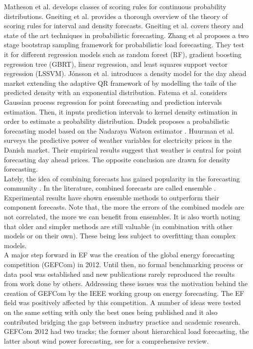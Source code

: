 Matheson et al. \cite{matheson1976scoring} develops classes of scoring rules for continuous probability distributions.
Gneiting et al. \cite{gneiting2007strictly}
provides a thorough overview of the theory of scoring rules for interval and density forecasts.
Gneiting et al. \cite{gneiting2014probabilistic}
covers theory and state of the art techniques in probabilistic forecasting.
Zhang et al \cite{zhang2020two} proposes a two stage bootstrap sampling framework for probabilistic load forecasting. They test it for different regression models such as random forest (RF), gradient boosting regression tree (GBRT), linear regression, and least squares support vector regression (LSSVM).
Jónsson et al. \cite{jonsson2014predictive}
introduces a density model for the day ahead market extending the adaptive QR framework of \cite{moller2008time} by modelling the tails of the predicted density with an exponential distribution.
Fatema et al. \cite{fatema2023probabilistic} considers Gaussian process regression for point forecasting and prediction intervals estimation. Then, it inputs prediction intervals to kernel density estimation in order to estimate a probability distribution.
Dudek \cite{dudek2018probabilistic} proposes a probabilistic forecasting model based on the Nadaraya Watson estimator \cite{nadaraya1964estimating,watson1964smooth}.
Huurman et al. \cite{huurman2012power} surveys the predictive power of weather variables for electricity prices in the Danish market. Their empirical results suggest that weather is central for point forecasting day ahead prices. The opposite conclusion are drawn for density forecasting.
\\
Lately, the idea of combining forecasts has gained popularity in the forecasting community \cite{forecasting_big}. In the literature, combined forecasts are called ensemble \cite{gneiting_weather_ensemble}.
Experimental results have shown ensemble methods to outperform their component forecasts.
Note that, the more the errors of the combined models are not correlated, the more we can benefit from ensembles.
It is also worth noting that older and simpler methods are still valuable (in combination with other models or on their own). These being less subject to overfitting than complex models.
\\
A major step forward in EF was the creation of the global energy forecasting competition (GEFCom) in 2012. Until then, no formal benchmarking process or data pool was established and new publications rarely reproduced the results from work done by others. Addressing these issues was the motivation behind the creation of GEFCom by the IEEE working group on energy forecasting. The EF field was positively affected by this competition. A number of ideas were tested on the same setting with only the best ones being published and it also contributed bridging the gap between industry practice and academic research. GEFCom 2012 had two tracks; the former about hierarchical load forecasting, the latter about wind power forecasting, see \cite{hong2014global} for a comprehensive review. 
